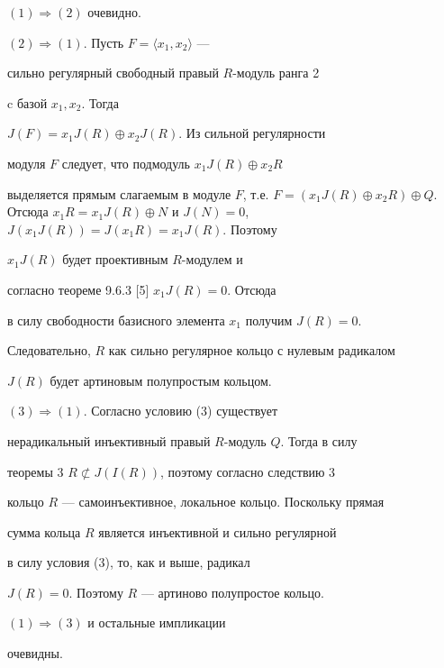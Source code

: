 \begin{pf} $(1) \Longrightarrow (2)$ очевидно.





$(2) \Longrightarrow (1)$. Пусть $F=\langle x_1,x_2\rangle$ ---


сильно регулярный свободный правый $R$-модуль ранга 2


c базой $x_1,x_2$. Тогда


$J(F)=x_1J(R) \oplus x_2J(R)$. Из сильной регулярности


модуля $F$ следует, что подмодуль $x_1J(R) \oplus x_2R$


выделяется прямым слагаемым в модуле $F$, т.е. $F=(x_1J(R)


\oplus x_2R) \oplus Q$. Отсюда $x_1R=x_1J(R) \oplus


N$ и $J(N)=0$, $J(x_1J(R))=J(x_1R)=x_{1}J(R)$. Поэтому


$x_1J(R)$ будет проективным $R$-модулем и


согласно теореме 9.6.3 [5] $x_1J(R)=0$. Отсюда


в силу свободности базисного элемента $x_1$ получим $J(R)=0$.


Следовательно, $R$ как сильно регулярное кольцо с нулевым радикалом


$J(R)$ будет артиновым полупростым кольцом.





$(3) \Longrightarrow (1)$. Согласно условию (3) существует


нерадикальный инъективный правый $R$-модуль $Q$. Тогда в силу


теоремы 3\; $R \not\subset J(I(R))$, поэтому согласно следствию 3


кольцо $R$ --- самоинъективное, локальное кольцо. Поскольку прямая


сумма кольца $R$ является инъективной и сильно регулярной


в силу условия (3), то, как и выше, радикал


$J(R)=0$. Поэтому $R$ --- артиново полупростое кольцо.





$(1) \Longrightarrow (3)$ и остальные импликации


очевидны.


\end{pf}






